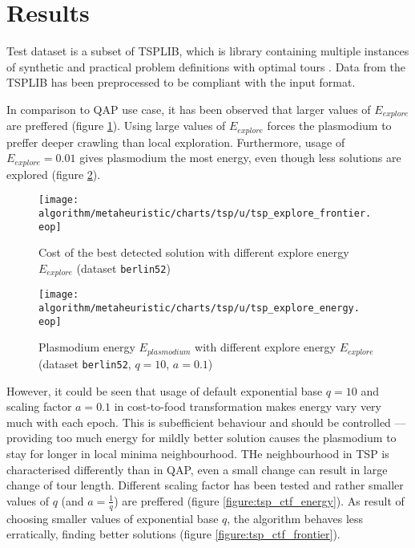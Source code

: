 \section*{Results}

Test dataset is a subset of TSPLIB, which is library containing multiple instances of synthetic and practical problem definitions with optimal tours \cite{reinhelt2014tsplib}. Data from the TSPLIB has been preprocessed to be compliant with the input format.

In comparison to QAP use case, it has been observed that larger values of $E_{explore}$ are preffered (figure \ref{figure:tsp_explore_frontier}). Using large values of $E_{explore}$ forces the plasmodium to preffer deeper crawling than local exploration. Furthermore, usage of $E_{explore}=0.01$ gives plasmodium the most energy, even though less solutions are explored (figure \ref{figure:tsp_explore_energy}).

\begin{figure}
  \centering

  \texttt{[image: algorithm/metaheuristic/charts/tsp/u/tsp\_explore\_frontier.\\eop]}

  \caption{Cost of the best detected solution with different explore energy $E_{explore}$ (dataset \texttt{berlin52})}
  \label{figure:tsp_explore_frontier}
\end{figure}

\begin{figure}
  \centering

  \texttt{[image: algorithm/metaheuristic/charts/tsp/u/tsp\_explore\_energy.\\eop]}

  \caption{Plasmodium energy $E_{plasmodium}$ with different explore energy $E_{explore}$ (dataset \texttt{berlin52}, $q=10$, $a=0.1$)}
  \label{figure:tsp_explore_energy}
\end{figure}

However, it could be seen that usage of default exponential base $q=10$ and scaling factor $a=0.1$ in cost-to-food transformation makes energy vary very much with each epoch. This is subefficient behaviour and should be controlled --- providing too much energy for mildly better solution causes the plasmodium to stay for longer in local minima neighbourhood. THe neighbourhood in TSP is characterised differently than in QAP, even a small change can result in large change of tour length. Different scaling factor has been tested and rather smaller values of $q$ (and $a=\frac{1}{q}$) are preffered (figure \ref{figure:tsp_ctf_energy}). As result of choosing smaller values of exponential base $q$, the algorithm behaves less erratically, finding better solutions (figure \ref{figure:tsp_ctf_frontier}). 

